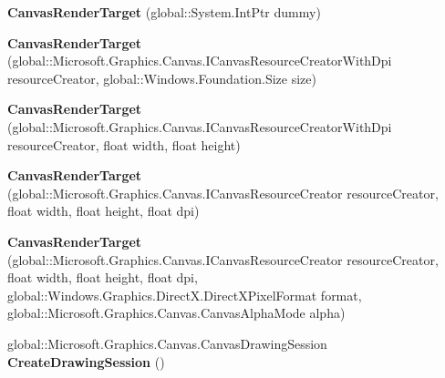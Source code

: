 \begin{DoxyCompactItemize}
\item 
\mbox{\label{class_microsoft_1_1_graphics_1_1_canvas_1_1_canvas_render_target_a4669138bf9504f494fe1e580a173f219}} 
{\bfseries Canvas\+Render\+Target} (global\+::\+System.\+Int\+Ptr dummy)
\item 
\mbox{\label{class_microsoft_1_1_graphics_1_1_canvas_1_1_canvas_render_target_a6e7619cdae74a3f3f23f3ad70840e69c}} 
{\bfseries Canvas\+Render\+Target} (global\+::\+Microsoft.\+Graphics.\+Canvas.\+I\+Canvas\+Resource\+Creator\+With\+Dpi resource\+Creator, global\+::\+Windows.\+Foundation.\+Size size)
\item 
\mbox{\label{class_microsoft_1_1_graphics_1_1_canvas_1_1_canvas_render_target_a1ebbe6ada521c806eb64d35b3c9d1c23}} 
{\bfseries Canvas\+Render\+Target} (global\+::\+Microsoft.\+Graphics.\+Canvas.\+I\+Canvas\+Resource\+Creator\+With\+Dpi resource\+Creator, float width, float height)
\item 
\mbox{\label{class_microsoft_1_1_graphics_1_1_canvas_1_1_canvas_render_target_a397381500ed5d38d360913faaac5baac}} 
{\bfseries Canvas\+Render\+Target} (global\+::\+Microsoft.\+Graphics.\+Canvas.\+I\+Canvas\+Resource\+Creator resource\+Creator, float width, float height, float dpi)
\item 
\mbox{\label{class_microsoft_1_1_graphics_1_1_canvas_1_1_canvas_render_target_a69d75f14eb0e74873b4a8ffb803dec0f}} 
{\bfseries Canvas\+Render\+Target} (global\+::\+Microsoft.\+Graphics.\+Canvas.\+I\+Canvas\+Resource\+Creator resource\+Creator, float width, float height, float dpi, global\+::\+Windows.\+Graphics.\+Direct\+X.\+Direct\+X\+Pixel\+Format format, global\+::\+Microsoft.\+Graphics.\+Canvas.\+Canvas\+Alpha\+Mode alpha)
\item 
\mbox{\label{class_microsoft_1_1_graphics_1_1_canvas_1_1_canvas_render_target_a12a2480b49988d0269ab6b58cc3a8433}} 
global\+::\+Microsoft.\+Graphics.\+Canvas.\+Canvas\+Drawing\+Session {\bfseries Create\+Drawing\+Session} ()

\end{DoxyCompactItemize}
